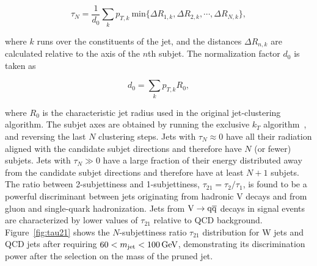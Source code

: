 \begin{equation}
\tau_N = \frac{1}{d_0} \sum_{k} p_{T,k}~\mathrm{min} \{\Delta R_{1,k},\Delta R_{2,k},\cdots,\Delta R_{N,k}\},
\end{equation}

\noindent where $k$ runs over the constituents of the jet, and the distances $\Delta R_{n,k}$ are calculated relative to the axis of the $n$th subjet. %
The normalization factor $d_0$ is taken as

\begin{equation}
d_0 = \sum_{k} p_{T,k} R_{0},
\end{equation}

\noindent where $R_0$ is the characteristic jet radius used in the original jet-clustering algorithm. The subjet axes are obtained by running the exclusive $k_T$ algorithm~\cite{Ellis:1993tq}, and reversing the last $N$ clustering steps.
Jets with $\tau_N \approx 0$ have all their radiation aligned with the candidate subjet directions and therefore have $N$ (or fewer) subjets. Jets with $\tau_N \gg 0$ have a large fraction of their energy distributed away from the candidate subjet directions and therefore have at least $N+1$ subjets.
The ratio between 2-subjettiness and 1-subjettiness, $\tau_{21} = \tau_{2}/\tau_{1}$, is found to be a powerful discriminant between jets originating from hadronic V decays and from gluon and single-quark hadronization. Jets from $\mathrm{V}\to\mathrm{q}\overline{\mathrm{q}}$ decays in signal events are characterized by lower values of $\tau_{21}$ relative to QCD background.
Figure~\ref{fig:tau21} shows the $N$-subjettiness ratio $\tau_{21}$ distribution for W jets and QCD jets after requiring $60 < m_{\text{jet}} < 100\,\text{Ge\hspace{-.08em}V}$, demonstrating its discrimination power after the selection on the mass of the pruned jet. %

